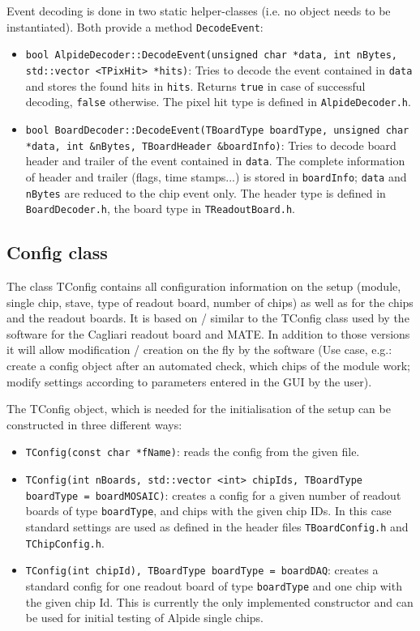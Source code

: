 \documentclass{article}
\begin{document}
Event decoding is done in two static helper-classes (i.e. no object needs to be instantiated). Both provide a method \texttt{DecodeEvent}:

\begin{itemize}
\item \texttt{bool AlpideDecoder::DecodeEvent(unsigned char *data, int
    nBytes, std::vector <TPixHit> *hits)}: Tries to decode the event
  contained in \texttt{data} and stores the found hits in
  \texttt{hits}. Returns \texttt{true} in case of successful decoding,
  \texttt{false} otherwise. The pixel hit type is defined in
  \texttt{AlpideDecoder.h}.
\item \texttt{bool BoardDecoder::DecodeEvent(TBoardType boardType, unsigned
    char *data, int \&nBytes, TBoardHeader \&boardInfo)}: Tries to
  decode board header and trailer of the event contained in
  \texttt{data}. The complete information of header and trailer
  (flags, time stamps...) is stored in \texttt{boardInfo}; \texttt{data}
  and \texttt{nBytes} are reduced to the chip event only. The header
  type is defined in \texttt{BoardDecoder.h}, the board type in
  \texttt{TReadoutBoard.h}. 
\end{itemize}



\subsection{Config class}

The class TConfig contains all configuration information on the setup
(module, single chip, stave, type of readout board, number of chips)
as well as for the chips and the readout boards. It is based on /
similar to the TConfig class used by the software for the Cagliari
readout board and MATE. In addition to those versions it will allow
modification / creation on the fly by the software (Use case, e.g.:
create a config object after an automated check, which chips of the
module work; modify settings according to parameters entered in the
GUI by the user). 

The TConfig object, which is needed for the initialisation of the
setup can be constructed in three different ways: 

\begin{itemize}
\item \texttt{TConfig(const char *fName)}: reads the config from the
    given file.
\item \texttt{TConfig(int nBoards, std::vector <int> chipIds, TBoardType boardType = boardMOSAIC)}:
  creates a config for a given number of readout boards of type \texttt{boardType}, and chips with the
  given chip IDs. In this case standard settings are used as defined
  in the header files \texttt{TBoardConfig.h} and
  \texttt{TChipConfig.h}.
\item \texttt{TConfig(int chipId), TBoardType boardType = boardDAQ}: creates a standard config for one
  readout board of type \texttt{boardType} and one chip with the given chip Id. This is currently the
  only implemented constructor and can be used for initial testing of
  Alpide single chips.
\end{itemize}
\end{document}

